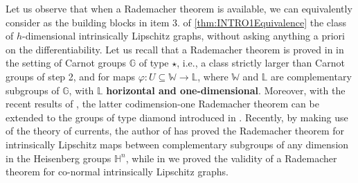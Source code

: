 \documentclass[10pt, a4paper,
oneside, headinclude,footinclude]{scrartcl}
\begin{document}

Let us observe that when a Rademacher theorem is available, we can equivalently consider as the building blocks in item 3. of \cref{thm:INTRO1Equivalence} the class of $h$-dimensional intrinsically Lipschitz graphs, without asking anything a priori on the differentiability. Let us recall that a Rademacher theorem is proved in \cite{FMS14, FSSC11} in the setting of Carnot groups $\mathbb G$ of type $\star$, i.e., a class strictly larger than Carnot groups of step 2, and for maps $\varphi:U\subseteq\mathbb W\to \mathbb L$, where $\mathbb W$ and $\mathbb L$ are complementary subgroups of $\mathbb G$, with $\mathbb L$ \textbf{horizontal and one-dimensional}. Moreover, with the recent results of \cite{LDM20}, the latter codimension-one Rademacher theorem can be extended to the groups of type diamond introduced in \cite{LDM20}.
Recently, by making use of the theory of currents, the author of \cite{Vittone20} has proved the Rademacher theorem for intrinsically Lipschitz maps between complementary subgroups of any dimension in the Heisenberg groups $\mathbb H^n$, while in \cite{AM20} we proved the validity of a Rademacher theorem for co-normal intrinsically Lipschitz graphs.
\end{document}
